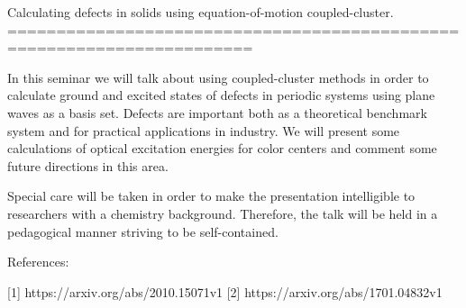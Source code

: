 Calculating defects in solids using equation-of-motion coupled-cluster.
=======================================================================

In this seminar we will talk about using coupled-cluster methods in order to
calculate ground and excited states of defects in periodic systems using
plane waves as a basis set.
Defects are important both as a theoretical benchmark system and for practical
applications in industry. We will present some calculations of optical
excitation energies for color centers and comment some future directions in
this area.

Special care will be taken in order to make the presentation intelligible to
researchers with a chemistry background. Therefore, the talk will be held in a
pedagogical manner striving to be self-contained.

References:

[1] https://arxiv.org/abs/2010.15071v1
[2] https://arxiv.org/abs/1701.04832v1
